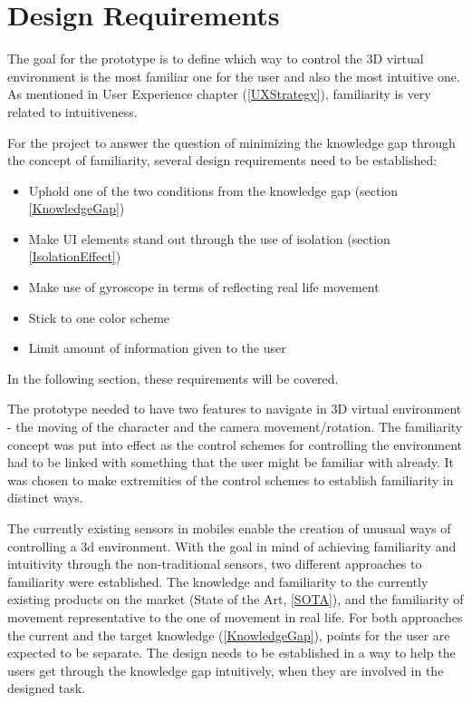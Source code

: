 \section{Design Requirements}
The goal for the prototype is to define which way to control the 3D virtual environment is the most familiar one for the user and also the most intuitive one. As mentioned in User Experience chapter (\ref{UXStrategy}), familiarity is very related to intuitiveness.

For the project to answer the question of minimizing the knowledge gap through the concept of familiarity, several design requirements need to be established:

\begin{itemize}
\item Uphold one of the two conditions from the knowledge gap (section \ref{KnowledgeGap})\
\item Make UI elements stand out through the use of isolation (section \ref{IsolationEffect})\
\item Make use of gyroscope in terms of reflecting real life movement\
\item Stick to one color scheme\
\item Limit amount of information given to the user\
\end{itemize}

In the following section, these requirements will be covered.

The prototype needed to have two features to navigate in 3D virtual environment - the moving of the character and the camera movement/rotation. The familiarity concept was put into effect as the control schemes for controlling the environment had to be linked with something that the user might be familiar with already. It was chosen to make extremities of the control schemes to establish familiarity in distinct ways.

The currently existing sensors in mobiles enable the creation of unusual ways of controlling a 3d environment. With the goal in mind of achieving familiarity and intuitivity through the non-traditional sensors, two different approaches to familiarity were established. The knowledge and familiarity to the currently existing products on the market (State of the Art, \ref{SOTA}), and the familiarity of movement representative to the one of movement in real life. For both approaches the current and the target knowledge (\ref{KnowledgeGap}), points for the user are expected to be separate. The design needs to be established in a way to help the users get through the knowledge gap intuitively, when they are involved in the designed task. 


